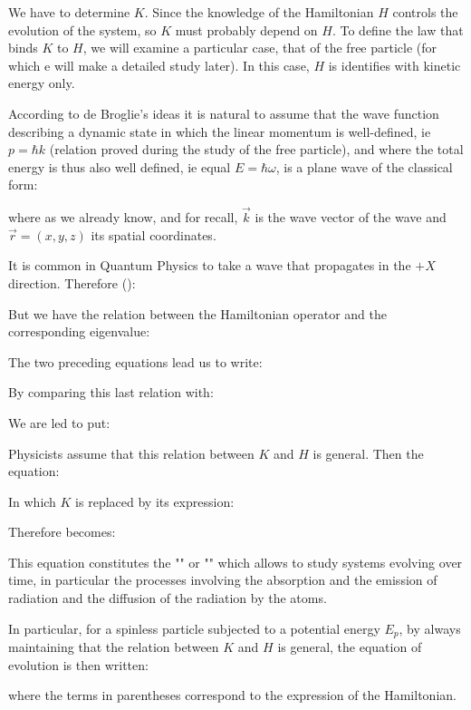 	We have to determine $K$. Since the knowledge of the Hamiltonian $H$ controls the evolution of the system, so $K$ must probably depend on $H$. To define the law that binds $K$ to $H$, we will examine a particular case, that of the free particle (for which e will make a detailed study later). In this case, $H$ is identifies with kinetic energy only.
	
	According to de Broglie's ideas it is natural to assume that the wave function describing a dynamic state in which the linear momentum is well-defined, ie $p=\hbar k$ (relation proved during the study of the free particle), and where the total energy is thus also well defined, ie equal $E=\hbar\omega$, is a plane wave of the classical form:
	
	where as we already know, and for recall, $\vec{k}$ is the wave vector of the wave and $\vec{r}=(x,y,z)$ its spatial coordinates.
	
	It is common in Quantum Physics to take a wave that propagates in the $+X$ direction. Therefore ():
	
	But we have the relation between the Hamiltonian operator and the corresponding eigenvalue:
	
	The two preceding equations lead us to write:
	
	By comparing this last relation with:
	
	We are led to put:
	
	Physicists assume that this relation between $K$ and $H$ is general. Then the equation:
	
	In which $K$ is replaced by its expression:
	
	Therefore becomes:
	
	This equation constitutes the "" or  "" which allows to study systems evolving over time, in particular the processes involving the absorption and the emission of radiation and the diffusion of the radiation by the atoms.
	
	In particular, for a spinless particle subjected to a potential energy $E_p$, by always maintaining that the relation between $K$ and $H$ is general, the equation of evolution is then written:
	
	where the terms in parentheses correspond to the expression of the Hamiltonian.

